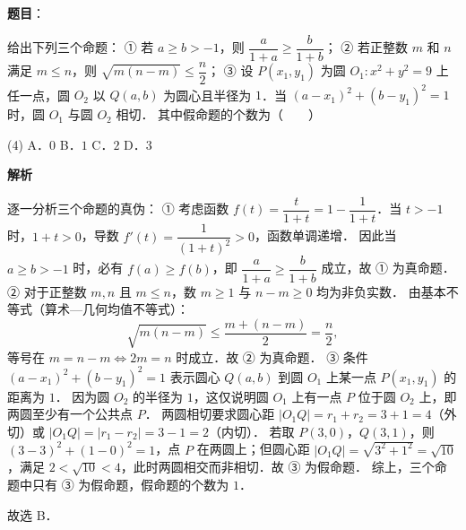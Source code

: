 \begin{answer}

\textbf{题目}：

给出下列三个命题：
① 若 $a \geqslant b > -1$，则 $\dfrac{a}{1+a} \geqslant \dfrac{b}{1+b}$；
② 若正整数 $m$ 和 $n$ 满足 $m \leqslant n$，则 $\sqrt{m(n-m)} \leqslant \dfrac{n}{2}$；
③ 设 $P(x_1, y_1)$ 为圆 $O_1 : x^2 + y^2 = 9$ 上任一点，圆 $O_2$ 以 $Q(a, b)$ 为圆心且半径为 $1$．当 $(a - x_1)^2 + (b - y_1)^2 = 1$ 时，圆 $O_1$ 与圆 $O_2$ 相切．
其中假命题的个数为\mbox{（　　）}

\begin{gkopts}(4)
\task A．$0$
\task B．$1$
\task C．$2$
\task D．$3$
\end{gkopts}

\textbf{解析}

逐一分析三个命题的真伪：
① 考虑函数 $f(t) = \dfrac{t}{1+t} = 1 - \dfrac{1}{1+t}$．当 $t > -1$ 时，$1+t > 0$，导数 $f'(t) = \dfrac{1}{(1+t)^2} > 0$，函数单调递增．
因此当 $a \geqslant b > -1$ 时，必有 $f(a) \geqslant f(b)$，即 $\dfrac{a}{1+a} \geqslant \dfrac{b}{1+b}$ 成立，故 ① 为真命题．
② 对于正整数 $m, n$ 且 $m \leqslant n$，数 $m \geqslant 1$ 与 $n - m \geqslant 0$ 均为非负实数．
由基本不等式（算术—几何均值不等式）：
\nopagebreak[4]
\[
\sqrt{m(n-m)} \leqslant \dfrac{m + (n - m)}{2} = \dfrac{n}{2},
\]
等号在 $m = n - m \iff 2m = n$ 时成立．故 ② 为真命题．
③ 条件 $(a - x_1)^2 + (b - y_1)^2 = 1$ 表示圆心 $Q(a, b)$ 到圆 $O_1$ 上某一点 $P(x_1, y_1)$ 的距离为 $1$．
因为圆 $O_2$ 的半径为 $1$，这仅说明圆 $O_1$ 上有一点 $P$ 位于圆 $O_2$ 上，即两圆至少有一个公共点 $P$．
两圆相切要求圆心距 $|O_1 Q| = r_1 + r_2 = 3 + 1 = 4$（外切）或 $|O_1 Q| = |r_1 - r_2| = 3 - 1 = 2$（内切）．
若取 $P(3, 0)$，$Q(3, 1)$，则 $(3-3)^2 + (1-0)^2 = 1$，点 $P$ 在两圆上；但圆心距 $|O_1 Q| = \sqrt{3^2 + 1^2} = \sqrt{10}$，满足 $2 < \sqrt{10} < 4$，此时两圆相交而非相切．故 ③ 为假命题．
综上，三个命题中只有 ③ 为假命题，假命题的个数为 $1$．

故选 B．


\end{answer}
